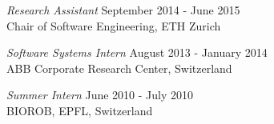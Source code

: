 \documentclass[margin, 10pt]{res} %
\begin{document}
\begin{resume}
{\sl Research Assistant} \hfill September 2014 - June 2015 \\
Chair of Software Engineering, ETH Zurich


{\sl Software Systems Intern} \hfill August 2013 - January 2014 \\
ABB Corporate Research Center, Switzerland

{\sl Summer Intern}  \hfill June 2010 - July 2010 \\
BIOROB, EPFL, Switzerland




\end{resume}
\end{document}
